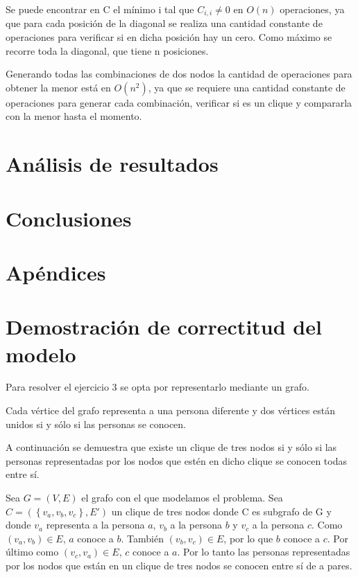 \documentclass[a4paper, 12pt]{article}
\begin{document}
Se puede encontrar en C el m\'inimo i tal que $C_{i,i} \neq 0$ en $O\left(n\right)$ operaciones, ya que para cada posici\'on de la diagonal se realiza una cantidad constante de operaciones para verificar si en dicha posici\'on hay un cero. Como m\'aximo se recorre toda la diagonal, que tiene n posiciones.


Generando todas las combinaciones de dos nodos la cantidad de operaciones para obtener la menor est\'a en $O\left(n^2\right)$, ya que se requiere una cantidad constante de operaciones para generar cada combinaci\'on, verificar si es un clique y compararla con la menor hasta el momento.


\section*{An\'alisis de resultados}
\section*{Conclusiones}

\section*{Ap\'endices}
\section{Demostraci\'on de correctitud del modelo}\label{dem_clique}

Para resolver el ejercicio 3 se opta por representarlo mediante un grafo.

Cada v\'ertice del grafo representa a una persona diferente y dos v\'ertices est\'an unidos si y s\'olo si las personas se conocen.


A continuaci\'on se demuestra que existe un clique de tres nodos si y s\'olo si las personas representadas por los nodos que est\'en en dicho clique se conocen todas entre s\'i. 

Sea $G = \left( V, E \right)$ el grafo con el que modelamos el problema. Sea $ C = \left( \left\lbrace v_a, v_b,v_c \right\rbrace, E' \right) $ un clique de tres nodos donde C es subgrafo de G y donde $v_a$ representa a la persona $a$, $v_b$ a la persona $b$ y $v_c$ a la persona $c$. Como $\left( v_a, v_b \right) \in E $, $a$ conoce a $b$. Tambi\'en $\left(v_b,v_c\right) \in E$, por lo que $b$ conoce a $c$. Por \'ultimo como $\left(v_c,v_a\right) \in E$, $c$ conoce a $a$. Por lo tanto las personas representadas por los nodos que est\'an en un clique de tres nodos se conocen entre s\'i de a pares.
\end{document}
